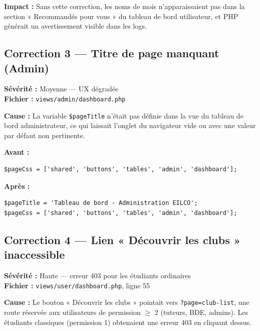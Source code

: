 \documentclass[12pt,a4paper]{article}
\begin{document}
\textbf{Impact :} Sans cette correction, les noms de mois n'apparaissaient pas
dans la section « Recommandés pour vous » du tableau de bord utilisateur, et
PHP générait un avertissement visible dans les logs.

\subsection{Correction 3 — Titre de page manquant (Admin)}

\begin{mdframed}[backgroundcolor=warning!20, linecolor=warning, linewidth=1.5pt]
\textbf{Sévérité :} Moyenne — UX dégradée\\
\textbf{Fichier :} \texttt{views/admin/dashboard.php}
\end{mdframed}

\vspace{0.5cm}
\textbf{Cause :} La variable \texttt{\$pageTitle} n'était pas définie dans la
vue du tableau de bord administrateur, ce qui laissait l'onglet du navigateur
vide ou avec une valeur par défaut non pertinente.

\textbf{Avant :}
\begin{lstlisting}
$pageCss = ['shared', 'buttons', 'tables', 'admin', 'dashboard'];
\end{lstlisting}

\textbf{Après :}
\begin{lstlisting}
$pageTitle = 'Tableau de bord - Administration EILCO';
$pageCss = ['shared', 'buttons', 'tables', 'admin', 'dashboard'];
\end{lstlisting}

\subsection{Correction 4 — Lien « Découvrir les clubs » inaccessible}

\begin{mdframed}[backgroundcolor=warning!20, linecolor=warning, linewidth=1.5pt]
\textbf{Sévérité :} Haute — erreur 403 pour les étudiants ordinaires\\
\textbf{Fichier :} \texttt{views/user/dashboard.php}, ligne 55
\end{mdframed}

\vspace{0.5cm}
\textbf{Cause :} Le bouton « Découvrir les clubs » pointait vers
\texttt{?page=club-list}, une route réservée aux utilisateurs de
permission $\geq$ 2 (tuteurs, BDE, admins). Les étudiants classiques
(permission 1) obtenaient une erreur 403 en cliquant dessus.
\end{document}
